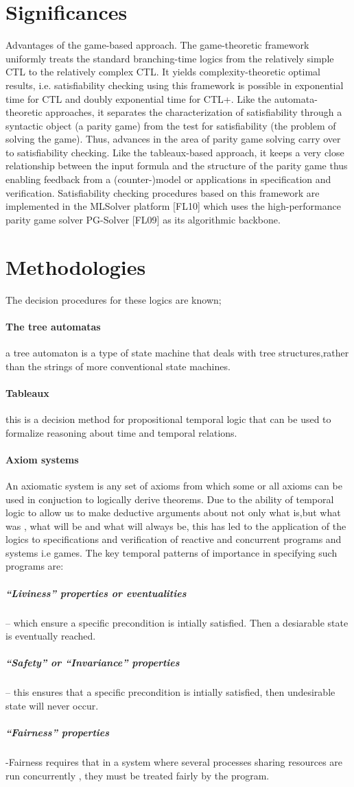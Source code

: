 \documentclass[12pt,letterpaper]{article}
\begin{document}
{\section{Significances}
Advantages of the game-based approach. The game-theoretic framework uniformly treats the standard branching-time logics from the relatively simple CTL to the relatively complex CTL.
 It yields complexity-theoretic optimal results, i.e. satisfiability checking using this framework
is possible in exponential time for CTL and doubly exponential time for CTL+.
 Like the automata-theoretic approaches, it separates the characterization of satisfiability
through a syntactic object (a parity game) from the test for satisfiability (the problem
of solving the game). Thus, advances in the area of parity game solving carry over to
satisfiability checking. Like the tableaux-based approach, it keeps a very close relationship between the input formula and the structure of the parity game thus enabling feedback from a (counter-)model or applications in specification and verification. Satisfiability checking procedures based on this framework are implemented in the
MLSolver platform [FL10] which uses the high-performance parity game solver PG-Solver [FL09] as its algorithmic backbone.

\section{Methodologies}
The decision procedures for these logics are known;
\paragraph{ The tree automatas}
	a tree automaton is a type of state machine that deals with tree structures,rather than the strings of more conventional state machines.
\paragraph{ Tableaux}
	this is a decision method for propositional temporal logic that can be used to formalize reasoning about time and temporal relations.
\paragraph{Axiom systems}
	An axiomatic system is any set of axioms from which some or all axioms can be used in conjuction to logically derive theorems.
Due to the ability of temporal logic to allow us to make deductive arguments about not only what is,but what was , what will be and what will always be, this has led to the application of the logics to specifications and verification of reactive and concurrent programs and systems i.e games.
The key temporal patterns of importance in specifying such programs are:
\subparagraph{“Liviness” properties or eventualities }– which ensure a specific precondition is intially satisfied. Then a desiarable state is eventually reached.
\subparagraph{“Safety” or “Invariance” properties} – this ensures that a specific precondition is intially satisfied, then undesirable state will never occur.
\subparagraph{“Fairness” properties} -Fairness requires that in a system where several processes sharing resources are run concurrently , they must be treated fairly by the program.
}
\end{document}
